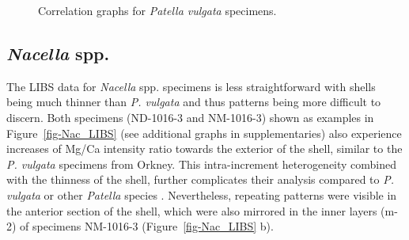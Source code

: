 \documentclass[
  authoryear,
  preprint,
  3p]{elsarticle}
\begin{document}
\begin{figure}


\caption{\label{fig-Pat_Corr}Correlation graphs for \emph{Patella
vulgata} specimens.}

\end{figure}%

\subsection{\texorpdfstring{\emph{Nacella}
spp.}{Nacella spp.}}\label{nacella-spp.}

The LIBS data for \emph{Nacella} spp. specimens is less straightforward
with shells being much thinner than \emph{P. vulgata} and thus patterns
being more difficult to discern. Both specimens (ND-1016-3 and
NM-1016-3) shown as examples in Figure~\ref{fig-Nac_LIBS} (see
additional graphs in supplementaries) also experience increases of Mg/Ca
intensity ratio towards the exterior of the shell, similar to the
\emph{P. vulgata} specimens from Orkney. This intra-increment
heterogeneity combined with the thinness of the shell, further
complicates their analysis compared to \emph{P. vulgata} or other
\emph{Patella} species \citep{Hausmann2019-fi}. Nevertheless, repeating
patterns were visible in the anterior section of the shell, which were
also mirrored in the inner layers (m-2) of specimens NM-1016-3
(Figure~\ref{fig-Nac_LIBS} b).
\end{document}
